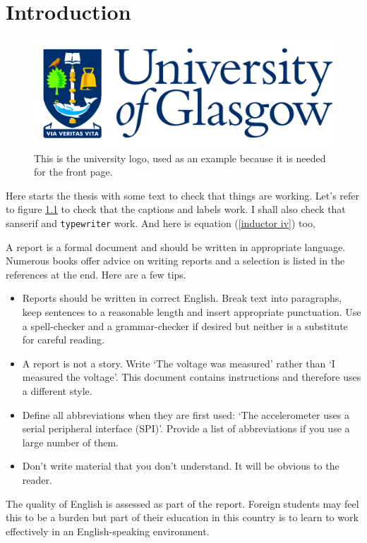 \chapter{Introduction}

\begin{figure}
\centering
\includegraphics[scale=0.125]{GlaLogo.pdf}
\caption{This is the university logo, used as an example because it is needed for the front page.}
\label{logo figure}
\end{figure}

Here starts the thesis with some text to check that things are working. Let's refer to figure \ref{logo figure} to check that the captions and labels work. I shall also check that \textsf{sanserif} and \texttt{typewriter} work. And here is equation (\ref{inductor iv}) too,

A report is a formal document and should be written in appropriate language. Numerous books offer advice on writing reports and a selection is listed in the references at the end. Here are a few tips.
\begin{itemize}
\item
Reports should be written in correct English. Break text into paragraphs, keep sentences to a reasonable length and insert appropriate punctuation. Use a spell-checker and a grammar-checker if desired but neither is a substitute for careful reading.
\item
A report is not a story.
Write `The voltage was measured' rather than `I measured the voltage'. This document contains instructions and therefore uses a different style.
\item
Define all abbreviations when they are first used: `The accelerometer uses a serial peripheral interface (SPI)'. Provide a list of abbreviations if you use a large number of them.
\item
Don't write material that you don't understand. It will be obvious to the reader.
\end{itemize}
The quality of English is assessed as part of the report. Foreign students may feel this to be a burden but part of their education in this country is to learn to work effectively in an English-speaking environment.


